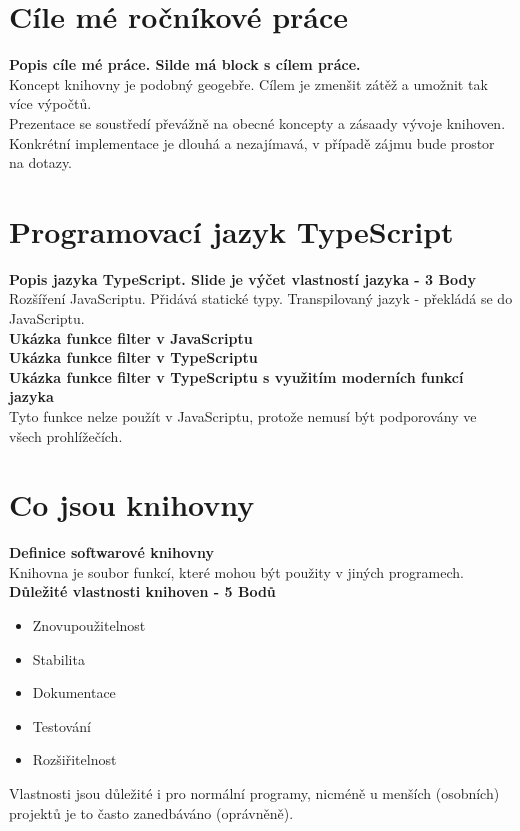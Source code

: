 

\section{Cíle mé ročníkové práce} {
  \textbf{Popis cíle mé práce. Silde má block s cílem práce.} \\
  Koncept knihovny je podobný geogebře. Cílem je zmenšit zátěž a umožnit tak více výpočtů. \\
  Prezentace se soustředí převážně na obecné koncepty a zásaady vývoje knihoven. \\
  Konkrétní implementace je dlouhá a nezajímavá, v případě zájmu bude prostor na dotazy. \\
 }

\section{Programovací jazyk TypeScript} {
  \textbf{Popis jazyka TypeScript. Slide je výčet vlastností jazyka - 3 Body} \\
  Rozšíření JavaScriptu. Přidává statické typy. Transpilovaný jazyk - překládá se do JavaScriptu. \\
  \textbf{Ukázka funkce filter v JavaScriptu} \\
  \textbf{Ukázka funkce filter v TypeScriptu} \\
  \textbf{Ukázka funkce filter v TypeScriptu s využitím moderních funkcí jazyka} \\
  Tyto funkce nelze použít v JavaScriptu, protože nemusí být podporovány ve všech prohlížečích. \\
 }

\section{Co jsou knihovny} {
  \textbf{Definice softwarové knihovny} \\
  Knihovna je soubor funkcí, které mohou být použity v jiných programech. \\
  \textbf{Důležité vlastnosti knihoven - 5 Bodů} \\
  \begin{itemize}
      \item Znovupoužitelnost
      \item Stabilita
      \item Dokumentace
      \item Testování
      \item Rozšiřitelnost
  \end{itemize}
  Vlastnosti jsou důležité i pro normální programy, nicméně u menších (osobních) projektů je to často zanedbáváno (oprávněně). \\
 }
\pagebreak
